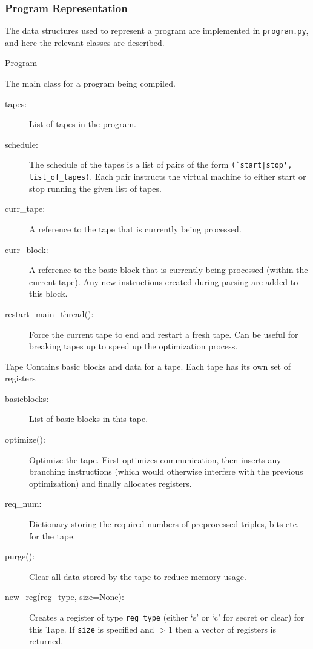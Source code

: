 \begin{mylisting}
\subsubsection{Program Representation}

The data structures used to represent a program are implemented in
\verb|program.py|, and here the relevant classes are described.

\begin{class}{Program}

The main class for a program being compiled.
\begin{description}
\item[tapes:] List of tapes in the program.
\item[schedule:] The schedule of the tapes is a list of pairs of the form
\verb+(`start|stop', list_of_tapes)+. Each pair instructs the virtual machine to
either start or stop running the given list of tapes.
\item[curr_tape:] A reference to the tape that is currently being processed.
\item[curr_block:] A reference to the basic block that is currently being
processed (within the current tape). Any new instructions created during
parsing are added to this block.
\item[restart_main_thread():] Force the current tape to end and restart a fresh
tape. Can be useful for breaking tapes up to speed up the optimization process.
\end{description}
\end{class}

\begin{class}{Tape}
Contains basic blocks and data for a tape. Each tape has its own set of
registers
\begin{description}
\item[basicblocks:] List of basic blocks in this tape.
\item[optimize():] Optimize the tape. First optimizes communication, then
inserts any branching instructions (which would otherwise interfere with the
previous optimization) and finally allocates registers.
\item[req_num:] Dictionary storing the required numbers of preprocessed
triples, bits etc. for the tape.
\item[purge():] Clear all data stored by the tape to reduce memory usage.
\item[new_reg(reg_type, size=None):] Creates a register of type \verb|reg_type|
(either `s' or `c' for secret or clear)
for this Tape. If \verb|size| is specified and $> 1$ then a vector of registers
is returned.
\end{description}
\end{class}


\end{mylisting}
